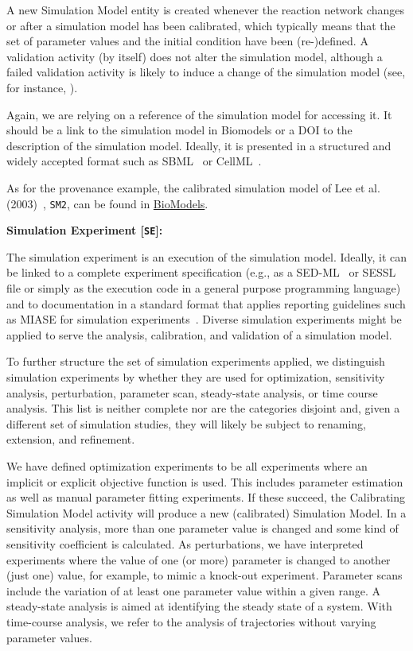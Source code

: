 \documentclass[10pt,letterpaper]{article}
\newcommand{\lee}{Lee et al. (2003)}
\newcommand{\SM}{Simulation Model}
\newcommand{\SE}{Simulation Experiment}
\newcommand{\CSM}{Calibrating Simulation Model}
\begin{document}
A new \SM{} entity is created whenever the reaction network changes or after a simulation model has been calibrated, which typically means that the set of parameter values and the initial condition have been (re-)defined.
A validation activity (by itself) does not alter the simulation model, although a failed validation activity is likely to induce a change of the simulation model (see, for instance, \cite{Haack2020}).

Again, we are relying on a reference of the simulation model for accessing it.
It should be a link to the simulation model in Biomodels or a DOI to the description of the simulation model.
Ideally, it is presented in a structured and widely accepted format such as SBML~\cite{Hucka2003} or CellML~\cite{Lloyd2004}.

As for the provenance example, the calibrated simulation model of \lee{}~\cite{Lee2003}, \texttt{SM2}, can be found in \href{https://www.ebi.ac.uk/biomodels/BIOMD0000000658}{BioModels}.


\textbf{\SE{} [\texttt{SE}]:}

\noindent The simulation experiment is an execution of the simulation model.
Ideally, it can be linked to a complete experiment specification (e.g., as a SED-ML~\cite{Koehn2008} or SESSL~\cite{Ewald2014} file or simply as the execution code in a general purpose programming language) and to documentation in a standard format that applies reporting guidelines such as MIASE for simulation experiments~\cite{Waltemath2011}.
Diverse simulation experiments might be applied to serve the analysis, calibration, and validation of a simulation model.

To further structure the set of simulation experiments applied, we distinguish simulation experiments by whether they are used for optimization, sensitivity analysis, perturbation, parameter scan, steady-state analysis, or time course analysis.
This list is neither complete nor are the categories disjoint and, given a different set of simulation studies, they will likely be subject to renaming, extension, and refinement.

We have defined optimization experiments to be all experiments where an implicit or explicit objective function is used.
This includes parameter estimation as well as manual parameter fitting experiments.
If these succeed, the \CSM{} activity will produce a new (calibrated) \SM{}.
In a sensitivity analysis, more than one parameter value is changed and some kind of sensitivity coefficient is calculated.
As perturbations, we have interpreted experiments where the value of one (or more) parameter is changed to another (just one) value, for example, to mimic a knock-out experiment.
Parameter scans include the variation of at least one parameter value within a given range.
A steady-state analysis is aimed at identifying the steady state of a system.
With time-course analysis, we refer to the analysis of trajectories without varying parameter values.
\end{document}

